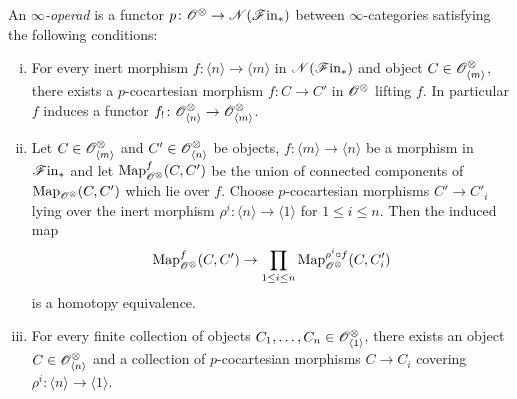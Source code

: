 \begin{defin}
    An $\infty${\em-operad} is a functor $p \colon \mathscr{O}^{\otimes} \to \mathscr{N}(\mathscr{F} \text{in}_{\ast})$ between
    $\infty$-categories satisfying the following conditions:
    \begin{enumerate}[(i)]
        \item For every inert morphism $f \colon \langle n \rangle \to \langle m
        \rangle$ in $\mathscr{N}(\mathscr{F} \text{in}_{\ast})$ and object $C \in \mathscr{O}^{\otimes}_{\langle m \rangle}$,
        there exists a $p$-cocartesian morphism $f \colon C \to C'$ in $\mathscr{O}^{\otimes}$
        lifting $f$. In particular $f$ induces a functor $f_{!} \colon
        \mathscr{O}^{\otimes}_{\langle n \rangle} \to \mathscr{O}^{\otimes}_{\langle m \rangle}$.
        \item Let $C \in \mathscr{O}^{\otimes}_{\langle m \rangle}$ and $C' \in \mathscr{O}^{\otimes}_{\langle n
        \rangle}$ be objects, $f : \langle m \rangle \to \langle n \rangle$ be a
        morphism in $\mathscr{F} \text{in}_{\ast}$ and let $\operatorname{Map}_{\mathscr{O}^{\otimes}}^f(C, C')$ be the union of
        connected components of $\operatorname{Map}_{\mathscr{O}^{\otimes}}(C, C')$ which lie over $f$. Choose
        $p$-cocartesian morphisms $C' \to C'_i$ lying over the inert morphism
        $\rho^i \colon \langle n \rangle \to \langle 1 \rangle$ for $1 \leq i
        \leq n$. Then the induced map
        \[
            \operatorname{Map}_{\mathscr{O}^{\otimes}}^f(C, C') \to \prod_{1 \leq i \leq n} \operatorname{Map}_{\mathscr{O}^{\otimes}}^{\rho^i \circ f}(C, C_i')
        \]
        is a homotopy equivalence.
        \item For every finite collection of objects $C_1, \dots, C_n \in
        \mathscr{O}^{\otimes}_{\langle 1 \rangle}$, there exists an object $C \in \mathscr{O}^{\otimes}_{\langle n
        \rangle}$ and a collection of $p$-cocartesian morphisms $C \to C_i$
        covering $\rho^i \colon \langle n \rangle \to \langle 1 \rangle$.
    \end{enumerate}
\end{defin}

    


% 